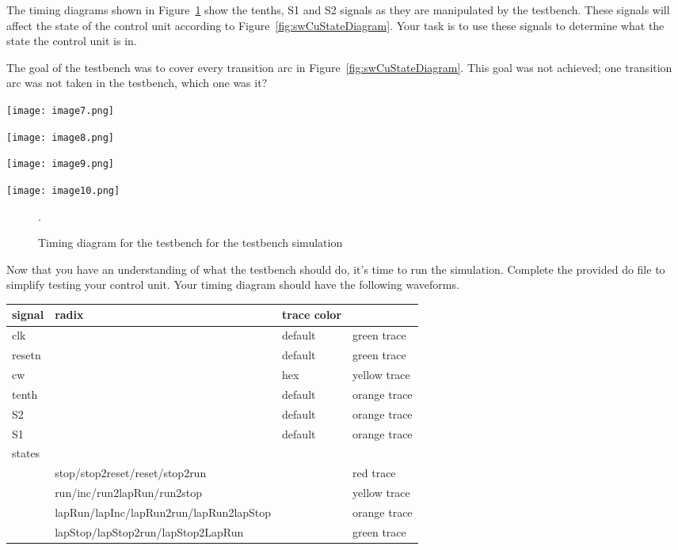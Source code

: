 The timing diagrams shown in Figure~\ref{fig:swCuSimTiming} show the tenths,
S1 and S2 signals as they are manipulated by the testbench. These
signals will affect the state of the control unit according to Figure~\ref{fig:swCuStateDiagram}.
Your task is to use these signals to determine what the state the
control unit is in.

The goal of the testbench was to cover every transition arc in Figure~\ref{fig:swCuStateDiagram}.
This goal was not achieved; one transition arc was not taken in the
testbench, which one was it?

\begin{landscape}

\texttt{[image: image7.png]}

\texttt{[image: image8.png]}


\texttt{[image: image9.png]}

\texttt{[image: image10.png]}
\begin{figure}
\caption{Timing diagram for the testbench for the testbench simulation}.
\label{fig:swCuSimTiming}
\end{figure}
\end{landscape}

Now that you have an understanding of what the testbench should do, it's
time to run the simulation. Complete the provided do file to simplify
testing your control unit. Your timing diagram should have the following
\hypertarget{swCuWaveform}{%
waveforms.
\label{swCuWaveform}}

\begin{tabular}{p{0.5cm}p{1.5cm}p{5cm}p{3cm}}
signal & radix & trace color \\ \hline
  clk 		& & default 		& green trace	\\ 
  resetn 	& & default 		& green trace	\\
  cw 		& & hex 		& yellow trace	\\
  tenth 	& & default 		& orange trace	\\
  S2 		& & default 		& orange trace	\\
  S1 		& & default 		& orange trace	\\
  states 	& &   		&			\\
 & stop/stop2reset/reset/stop2run 			& & red trace	\\ 
& run/inc/run2lapRun/run2stop 			& & yellow 	trace\\ 
& lapRun/lapInc/lapRun2run/lapRun2lapStop	& & orange  trace\\
& lapStop/lapStop2run/lapStop2LapRun   		&  & green  trace\\
\end{tabular}\\

